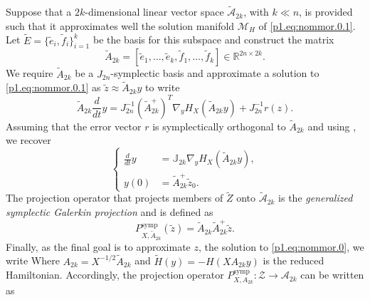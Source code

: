 Suppose that a $2k$-dimensional linear vector space $\tilde{ \mathcal A}_{2k}$, with $k\ll n$, is provided such that it approximates well the solution manifold $\mathcal M_H$ of \eqref{p1.eq:nommor.0.1}. Let $\tilde E = \{ \tilde e_i,\tilde f_i \}_{i=1}^k$ be the basis for this subspace and construct the matrix
\begin{equation} \label{p1.eq:nommor.0.7}
	\tilde A_{2k} = [\tilde e_1,\dots,\tilde e_k,\tilde f_1,\dots,\tilde f_k] \in \mathbb R^{2n\times 2k}.
\end{equation}
We require $\tilde A_{2k}$ be a $J_{2n}$-symplectic basis and approximate a solution to \eqref{p1.eq:nommor.0.1} as $\tilde z \approx \tilde A_{2k} y$ to write
\begin{equation} \label{p1.eq:nommor.0.8}
	\tilde A_{2k} \frac d {dt} y = J^{-1}_{2n} (\tilde A_{2k}^+)^T \nabla_{y} H_X(\tilde A_{2k}y) + J^{-1}_{2n} r(z).
\end{equation}
Assuming that the error vector $r$ is symplectically orthogonal to $\tilde A_{2k}$ and using , we recover
\begin{equation}
	\left\{
	\begin{aligned}
		\frac d {dt} y &= \mathbb J_{2k} \nabla_{y} H_X(\tilde A_{2k} y), \\
		y(0) &= \tilde A_{2k}^+ \tilde z_0.
	\end{aligned}
	\right.	
\end{equation}
The projection operator that projects members of $\tilde Z$ onto $\tilde {\mathcal A}_{2k}$ is the \emph{generalized symplectic Galerkin projection} and is defined as
\begin{equation} \label{p1.eq:nommor.0.9}
	P_{X,\tilde A_{2k}}^{\text{symp}}(\tilde z) = \tilde A_{2k} \tilde A_{2k}^+ \tilde z.
\end{equation}
Finally, as the final goal is to approximate $z$, the solution to \eqref{p1.eq:nommor.0}, we write
Where $A_{2k} = X^{-1/2} \tilde A_{2k}$ and $\tilde H(y) = -H(XA_{2k}y)$ is the reduced Hamiltonian. Accordingly, the projection operator $P_{X,A_{2k}}^\text{symp}:\mathcal Z\to \mathcal A_{2k}$ can be written as
